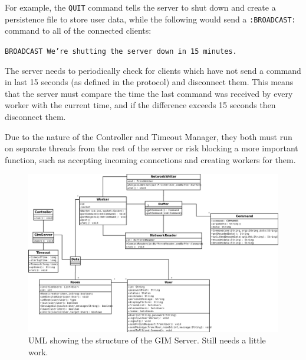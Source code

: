 For example, the \texttt{QUIT} command tells the server to shut down and create a persistence file to store user data, while the following would send a \texttt{:BROADCAST:} command to all of the connected clients:

\texttt{BROADCAST We're shutting the server down in 15 minutes.}

The server needs to periodically check for clients which have not send a command in last 15 seconds (as defined in the protocol) and disconnect them. This means that the server must compare the time the last command was received by every worker with the current time, and if the difference exceeds 15 seconds then disconnect them.

Due to the nature of the Controller and Timeout Manager, they both must run on separate threads from the rest of the server or risk blocking a more important function, such as accepting incoming connections and creating workers for them.

\begin{landscape}
    \begin{figure}
        \begin{center}
            \includegraphics[scale=0.5]{Design/diagrams/server_uml.png}
            \caption{UML showing the structure of the GIM Server. Still needs a little work.}
            \label{highLevelDia}
        \end{center}
    \end{figure}
\end{landscape}
